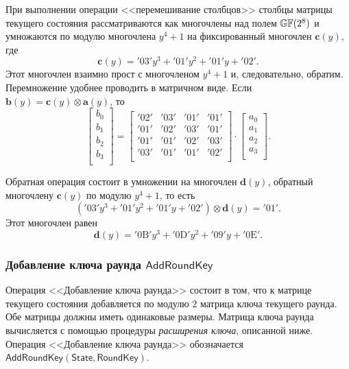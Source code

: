 При выполнении операции <<перемешивание столбцов>> столбцы матрицы текущего состояния рассматриваются как многочлены над полем $\mathbb{GF}(2^8)$ и умножаются по модулю многочлена $y^4 +1$ на фиксированный многочлен $\mathbf{c}(y)$, где
    \[ \mathbf{c}(y) = \mathrm{'03'} y^3 + \mathrm{'01'} y^2 + \mathrm{'01'} y + \mathrm{'02'}. \]
Этот многочлен взаимно прост с многочленом $y^4 + 1$ и, следовательно, обратим. Перемножение удобнее проводить в матричном виде. Если $\mathbf{b}(y) = \mathbf{c}(y) \otimes \mathbf{a}(y)$, то
\[
    \left[ \begin{array}{c}
        b_{0} \\ b_{1} \\ b_{2} \\ b_{3} \\
    \end{array}\right] =  \left[ \begin{array}{cccc}
        \mathrm{'02'} & \mathrm{'03'} & \mathrm{'01'} & \mathrm{'01'} \\
        \mathrm{'01'} & \mathrm{'02'} & \mathrm{'03'} & \mathrm{'01'} \\
        \mathrm{'01'} & \mathrm{'01'} & \mathrm{'02'} & \mathrm{'03'} \\
        \mathrm{'03'} & \mathrm{'01'} & \mathrm{'01'} & \mathrm{'02'} \\
    \end{array} \right] \cdot \left[ \begin{array}{c}
        a_{0} \\ a_{1} \\ a_{2} \\ a_{3} \\
     \end{array} \right].
\]

Обратная операция состоит в умножении на многочлен $\mathbf{d}(y)$, обратный многочлену $\mathbf{c}(y)$ по модулю $y^4 + 1$, то есть
\[
    (\mathrm{'03'} y^{3} + \mathrm{'01'} y^{2} + \mathrm{'01'} y + \mathrm{'02'}) \otimes \mathbf{d}(y) = \mathrm{'01'}.
\]
Этот многочлен равен
\[
    \mathbf{d}(y) = \mathrm{'0B'} y^3 + \mathrm{'0D'} y^2 + \mathrm{'09'} y + \mathrm{'0E'}.
\]


\subsubsection{Добавление ключа раунда $\mathsf{AddRoundKey}$}

Операция <<Добавление ключа раунда>> состоит в том, что к матрице текущего состояния добавляется по модулю $2$ матрица ключа текущего раунда. Обе матрицы должны иметь одинаковые размеры. Матрица ключа раунда вычисляется с помощью процедуры \emph{расширения ключа}, описанной ниже. Операция <<Добавление ключа раунда>> обозначается $\mathsf{AddRoundKey(State, RoundKey)}$.

